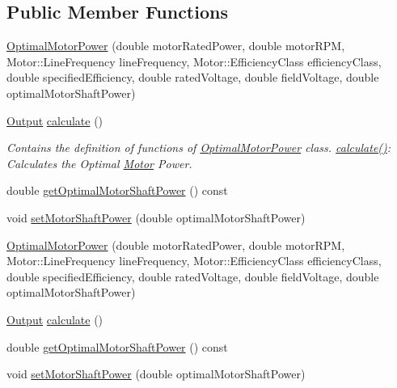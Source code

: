 \subsection*{Public Member Functions}
\begin{DoxyCompactItemize}
\item 
\hyperlink{class_optimal_motor_power_a36017bbd359437ce77c1e18dc2377961}{Optimal\+Motor\+Power} (double motor\+Rated\+Power, double motor\+R\+PM, Motor\+::\+Line\+Frequency line\+Frequency, Motor\+::\+Efficiency\+Class efficiency\+Class, double specified\+Efficiency, double rated\+Voltage, double field\+Voltage, double optimal\+Motor\+Shaft\+Power)
\item 
\hyperlink{struct_optimal_motor_power_1_1_output}{Output} \hyperlink{class_optimal_motor_power_aa9f5364de1af6fd5c038b98e8509b1fb}{calculate} ()
\begin{DoxyCompactList}\small\item\em Contains the definition of functions of \hyperlink{class_optimal_motor_power}{Optimal\+Motor\+Power} class. \hyperlink{class_optimal_motor_power_aa9f5364de1af6fd5c038b98e8509b1fb}{calculate()}\+: Calculates the Optimal \hyperlink{struct_motor}{Motor} Power. \end{DoxyCompactList}\item 
double \hyperlink{class_optimal_motor_power_a7d6e976abf406c54637d3b51e098d7c8}{get\+Optimal\+Motor\+Shaft\+Power} () const
\item 
void \hyperlink{class_optimal_motor_power_ada8a9e3caac34c54470ad13ffe7edf53}{set\+Motor\+Shaft\+Power} (double optimal\+Motor\+Shaft\+Power)
\item 
\hyperlink{class_optimal_motor_power_a36017bbd359437ce77c1e18dc2377961}{Optimal\+Motor\+Power} (double motor\+Rated\+Power, double motor\+R\+PM, Motor\+::\+Line\+Frequency line\+Frequency, Motor\+::\+Efficiency\+Class efficiency\+Class, double specified\+Efficiency, double rated\+Voltage, double field\+Voltage, double optimal\+Motor\+Shaft\+Power)
\item 
\hyperlink{struct_optimal_motor_power_1_1_output}{Output} \hyperlink{class_optimal_motor_power_ab756397f68c530172d4fdd5ce8d2d27d}{calculate} ()
\item 
double \hyperlink{class_optimal_motor_power_a7d6e976abf406c54637d3b51e098d7c8}{get\+Optimal\+Motor\+Shaft\+Power} () const
\item 
void \hyperlink{class_optimal_motor_power_ada8a9e3caac34c54470ad13ffe7edf53}{set\+Motor\+Shaft\+Power} (double optimal\+Motor\+Shaft\+Power)
\item 

\end{DoxyCompactItemize}
